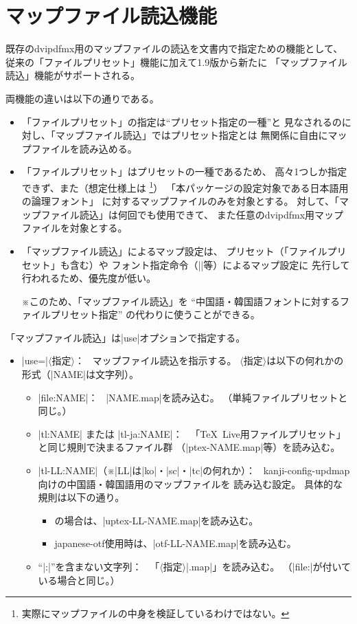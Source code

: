 \documentclass[uplatex,dvipdfmx,a4paper]{jsarticle}
\newcommand{\Pkg}[1]{\textsf{#1}}
\newcommand{\Meta}[1]{$\langle$\mbox{}#1\mbox{}$\rangle$}
\newcommand{\Note}{\par\noindent ※}
\newcommand{\Means}{：\ }
\newcommand{\Zk}{\mbox{}}
\begin{document}
\section{マップファイル読込機能}
\label{sec:MapFileLoad}

既存のdvipdfmx用のマップファイルの読込を文書内で指定ための機能として、
従来の「ファイルプリセット」機能に加えて1.9版から新たに
「マップファイル読込」機能がサポートされる。

両機能の違いは以下の通りである。
\begin{itemize}
\item 「ファイルプリセット」の指定は“プリセット指定の一種”と
見なされるのに対し、「マップファイル読込」ではプリセット指定とは
無関係に自由にマップファイルを読み込める。
\item 「ファイルプリセット」はプリセットの一種であるため、
高々1つしか指定できず、また（想定仕様上は
\footnote{実際にマップファイルの中身を検証しているわけではない。}）
「本パッケージの設定対象である日本語用の論理フォント」
に対するマップファイルのみを対象とする。
対して、「マップファイル読込」は何回でも使用できて、
また任意のdvipdfmx用マップファイルを対象とする。
\item 「マップファイル読込」によるマップ設定は、
プリセット（「ファイルプリセット」も含む）や
フォント指定命令（|\setminchofont|等）によるマップ設定に
先行して行われるため、優先度が低い。
\Note このため、「マップファイル読込」を
“中国語・韓国語フォントに対するファイルプリセット指定”
の代わりに使うことができる。
\end{itemize}

「マップファイル読込」は|use|オプションで指定する。

\begin{itemize}
\item |use=|\Meta{指定}\Means
  マップファイル読込を指示する。
  \Meta{指定}は以下の何れかの形式（|NAME|は文字列）。
  \begin{itemize}
  \item |file:NAME|\Means
    |NAME.map|を読み込む。
    （単純ファイルプリセットと同じ。）
  \item |tl:NAME| または |tl-ja:NAME|\Means
    「{\TeX}~Live用ファイルプリセット」と同じ規則で決まるファイル群
    （|ptex-NAME.map|等）を読み込む。
  \item |tl-LL:NAME|（※|LL|は|ko|・|sc|・|tc|の何れか）\Means
    kanji-config-updmap向けの中国語・韓国語用のマップファイルを
    読み込む設定。
    具体的な規則は以下の通り。
    \begin{itemize}
    \item {\upLaTeX}の場合は、|uptex-LL-NAME.map|を読み込む。
    \item \Pkg{japanese-otf}使用時は、|otf-LL-NAME.map|を読み込む。
    \end{itemize}
  \item “|:|”を含まない文字列\Means
    「\Meta{指定}\Zk|.map|」を読み込む。
    （|file:|が付いている場合と同じ。）
  \end{itemize}
\end{itemize}
\end{document}
